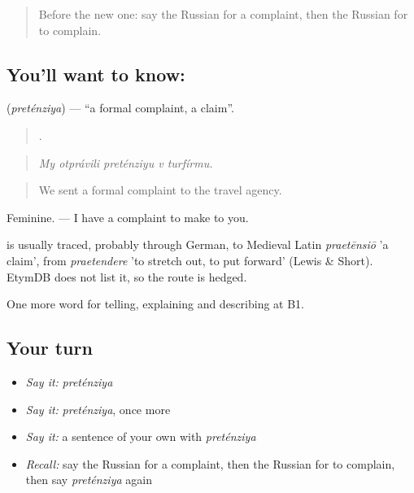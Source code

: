 \label{lesson:RU-C434-pretenziya}



\begin{quote}
Before the new one: say the Russian for a complaint, then the Russian for to complain.
\end{quote}

\subsection*{You'll want to know: }
\textbf{} (\emph{preténziya}) — \textquotedblleft{}a formal complaint, a claim\textquotedblright{}.

\begin{quote}
    .
\end{quote}

\begin{quote}
\emph{My otprávili preténziyu v turfírmu.}
\end{quote}

\begin{quote}
We sent a formal complaint to the travel agency.
\end{quote}

Feminine. \emph{    } — I have a complaint to make to you.

\begin{cousinweb}
\emph{} is usually traced, probably through German, to Medieval Latin \emph{praetēnsiō} 'a claim', from \emph{praetendere} 'to stretch out, to put forward' (Lewis \& Short). EtymDB does not list it, so the route is hedged.
\end{cousinweb}

\begin{grammarlens}[title={What you've built}]
One more word for telling, explaining and describing at B1.
\end{grammarlens}

\subsection*{Your turn}
\begin{itemize}
\raggedright
  \item \emph{Say it:} \emph{preténziya}
  \item \emph{Say it:} \emph{preténziya}, once more
  \item \emph{Say it:} a sentence of your own with \emph{preténziya}
  \item \emph{Recall:} say the Russian for a complaint, then the Russian for to complain, then say \emph{preténziya} again
\end{itemize}

